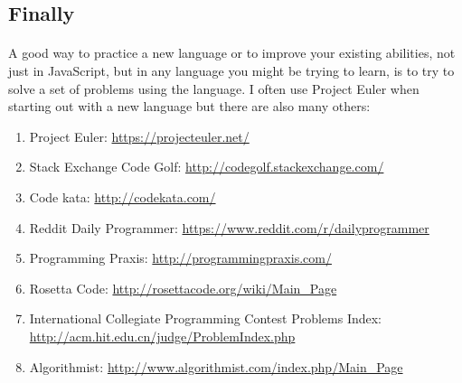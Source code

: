 \documentclass[10pt, a4paper, twosize]{article}
\begin{document}

\subsection{Finally}
\paragraph{} A good way to practice a new language or to improve your existing abilities, not just in JavaScript, but in any language you might be trying to learn, is to try to solve a set of problems using the language. I often use Project Euler when starting out with a new language but there are also many others:

\begin{enumerate}
\item Project Euler: \url{https://projecteuler.net/}
\item Stack Exchange Code Golf: \url{http://codegolf.stackexchange.com/}
\item Code kata: \url{http://codekata.com/}
\item Reddit Daily Programmer: \url{https://www.reddit.com/r/dailyprogrammer}
\item Programming Praxis: \url{http://programmingpraxis.com/}
\item Rosetta Code: \url{http://rosettacode.org/wiki/Main_Page}
\item International Collegiate Programming Contest Problems Index: \url{http://acm.hit.edu.cn/judge/ProblemIndex.php}
\item Algorithmist: \url{http://www.algorithmist.com/index.php/Main_Page}
\end{enumerate}
\end{document}

